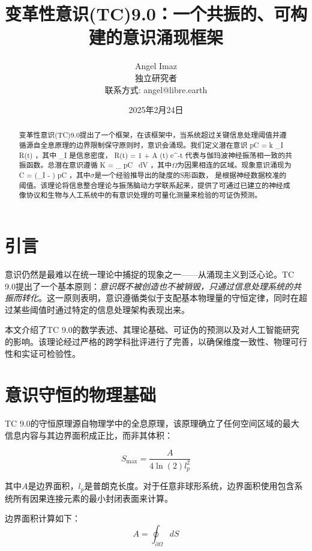 \documentclass[12pt]{article}
\title{变革性意识(TC)9.0：一个共振的、可构建的意识涌现框架}
\author{Angel Imaz \\ 独立研究者 \\ 联系方式: angel@libre.earth}
\date{2025年2月24日}
\def\({}%
\def\){}%
\begin{document}
\maketitle

\begin{abstract}
变革性意识(TC)9.0提出了一个框架，在该框架中，当系统超过关键信息处理阈值并遵循源自全息原理的边界限制保守原则时，意识会涌现。我们定义潜在意识 \( pC = k \cdot \rho_I \cdot R(t) \)，其中 \( \rho_I \) 是信息密度，\( R(t) = 1 + A \cdot \sin(\omega t) \cdot e^{-\gamma t} \) 代表与伽玛波神经振荡相一致的共振函数。总潜在意识遵循 \( K = \int_{\Omega} pC \, dV \)，其中$\Omega$为因果相连的区域。现象意识涌现为 \( C = \sigma(\rho_I - \theta) \cdot pC \)，其中$\sigma$是一个经验推导出的陡度的S形函数，\( \theta \) 是根据神经数据校准的阈值。该理论将信息整合理论与振荡脑动力学联系起来，提供了可通过已建立的神经成像协议和生物与人工系统中的有意识处理的可量化测量来检验的可证伪预测。
\end{abstract}

\section{引言}
意识仍然是最难以在统一理论中捕捉的现象之一——从涌现主义\cite{tononi2008}到泛心论\cite{goff2019}。TC 9.0提出了一个基本原则：\emph{意识既不被创造也不被销毁，只通过信息处理系统的共振而转化}。这一原则表明，意识遵循类似于支配基本物理量的守恒定律，同时在超过某些阈值时通过特定的信息处理架构表现出来。

本文介绍了TC 9.0的数学表述、其理论基础、可证伪的预测以及对人工智能研究的影响。该理论经过严格的跨学科批评进行了完善，以确保维度一致性、物理可行性和实证可检验性。

\section{意识守恒的物理基础}

TC 9.0的守恒原理源自物理学中的全息原理\cite{susskind1995,bousso2002}，该原理确立了任何空间区域的最大信息内容与其边界面积成正比，而非其体积：

\begin{equation}
S_{\text{max}} = \frac{A}{4\ln(2)l_p^2}
\end{equation}

其中$A$是边界面积，$l_p$是普朗克长度。对于任意非球形系统，边界面积使用包含系统所有因果连接元素的最小封闭表面来计算。

边界面积计算如下：
\begin{equation}
A = \oint_{\partial \Omega} dS
\end{equation}
\end{document}
